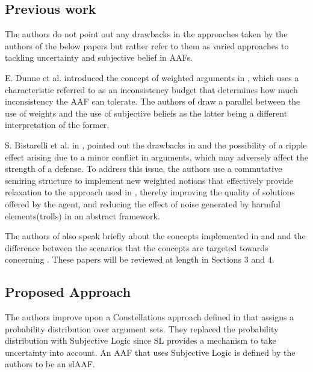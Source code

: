\documentclass[UTF8]{article}
\begin{document}
\subsection{Previous work}
The authors do not point out any drawbacks in the approaches taken by the authors of the below papers but rather refer to them as varied approaches to tackling uncertainty and subjective belief in AAFs.

E. Dunne et al. introduced the concept of weighted arguments in \cite{DUNNE2011457}, which uses a characteristic referred to as an inconsistency budget
that determines how much inconsistency the AAF can tolerate. The authors of \cite{8455455} draw a parallel between the use of weights and the use of subjective beliefs as the latter being a different interpretation of the former.

S. Bistarelli et al. in \cite{Bistarelli}, pointed out the drawbacks in \cite{DUNNE2011457} and the possibility of a ripple effect arising due to a minor conflict in arguments, which may adversely affect the
strength of a defense. To address this issue, the authors use a commutative semiring structure to implement new weighted notions that effectively provide relaxation to the approach used in \cite{DUNNE2011457}, 
thereby improving the quality of solutions offered by the agent, and reducing the effect of noise generated by harmful elements(trolls) in an abstract framework.

The authors of \cite{8455455} also speak briefly about the concepts implemented in \cite{Koster2017} and \cite{OREN2007838} and the difference between the scenarios that the concepts are targeted towards concerning \cite{8455455}. 
These papers will be reviewed at length in Sections 3 and 4.

\subsection{Proposed Approach}
The authors improve upon a Constellations approach defined in \cite{dung2010towards} that assigns a probability distribution 
over argument sets. 
They replaced the probability distribution with Subjective Logic since SL provides a mechanism to take uncertainty into account. An AAF that
uses Subjective Logic is defined by the authors to be an slAAF. 
\end{document}
